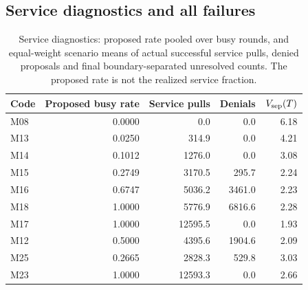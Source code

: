 \documentclass[11pt]{article}
\theoremstyle{remark}
\begin{document}
\subsection{Service diagnostics and all failures}
\begin{table}[t]
\centering
\caption{Service diagnostics: proposed rate pooled over busy rounds, and equal-weight scenario means of actual successful service pulls, denied proposals and final boundary-separated unresolved counts. The proposed rate is not the realized service fraction.}
\label{tab:service-diagnostics}
\footnotesize
\begin{tabular}{lrrrr}
\toprule
Code & Proposed busy rate & Service pulls & Denials & $V_{\rm sep}(T)$ \\
\midrule
M08 & 0.0000 & 0.0 & 0.0 & 6.18 \\
M13 & 0.0250 & 314.9 & 0.0 & 4.21 \\
M14 & 0.1012 & 1276.0 & 0.0 & 3.08 \\
M15 & 0.2749 & 3170.5 & 295.7 & 2.24 \\
M16 & 0.6747 & 5036.2 & 3461.0 & 2.23 \\
M18 & 1.0000 & 5776.9 & 6816.6 & 2.28 \\
M17 & 1.0000 & 12595.5 & 0.0 & 1.93 \\
M12 & 0.5000 & 4395.6 & 1904.6 & 2.09 \\
M25 & 0.2665 & 2828.3 & 529.8 & 3.03 \\
M23 & 1.0000 & 12593.3 & 0.0 & 2.66 \\
\bottomrule
\end{tabular}
\end{table}
\end{document}
